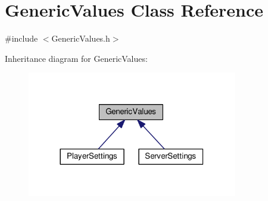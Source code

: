 \hypertarget{classGenericValues}{}\section{Generic\+Values Class Reference}
\label{classGenericValues}


{\ttfamily \#include $<$Generic\+Values.\+h$>$}



Inheritance diagram for Generic\+Values\+:
\nopagebreak
\begin{figure}[H]
\begin{center}
\leavevmode
\includegraphics[width=260pt]{classGenericValues__inherit__graph}
\end{center}
\end{figure}
